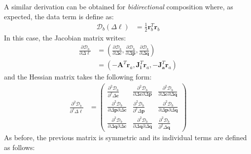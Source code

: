 A similar derivation can be obtained for \emph{bidirectional} composition where, as expected, the data term is define as:
\begin{equation}
    \begin{aligned}
		\mathcal{D}_b(\Delta \boldsymbol{\ell}) & = \frac{1}{2}\mathbf{r}_b^T \mathbf{r}_b
    \label{eq:bidirectional_data}
    \end{aligned}
\end{equation}
In this case, the Jacobian matrix writes:
\begin{equation}
    \begin{aligned}
		\frac{\partial \mathcal{D}_b}{\partial \Delta \boldsymbol{\ell}} & = \left( \frac{\partial \mathcal{D}_b}{\partial \Delta \mathbf{c}}, \frac{\partial \mathcal{D}_b}{\partial \Delta \mathbf{p}}, \frac{\partial \mathcal{D}_b}{\partial \Delta \mathbf{q}} \right)
		\\
		& = \left( -\mathbf{A}^T \mathbf{r}_a, \mathbf{J}_{\mathbf{i}}^T \mathbf{r}_a, -\mathbf{J}_{\mathbf{a}}^T \mathbf{r}_a \right)
    \label{eq:bidirectional_newton_jacobian}
    \end{aligned}
\end{equation}
and the Hessian matrix takes the following form:
\begin{equation}
    \begin{aligned}
		\frac{\partial^2 \mathcal{D}_b}{\partial^2 \Delta \boldsymbol{\ell}} & =
		\begin{pmatrix}
			\frac{\partial^2 \mathcal{D}_b}{\partial^2 \Delta \mathbf{c}} & \frac{\partial^2 \mathcal{D}_b}{\partial \Delta \mathbf{c} \partial \Delta \mathbf{p}} & \frac{\partial^2 \mathcal{D}_b}{\partial \Delta \mathbf{c} \partial \Delta \mathbf{q}}
			\\
			\frac{\partial^2 \mathcal{D}_b}{\partial \Delta \mathbf{p} \partial \Delta \mathbf{c}} & \frac{\partial^2 \mathcal{D}_b}{\partial^2 \Delta \mathbf{p}} & \frac{\partial^2 \mathcal{D}_b}{\partial \Delta \mathbf{p} \partial \Delta \mathbf{q}}
			\\
			\frac{\partial^2 \mathcal{D}_b}{\partial \Delta \mathbf{q} \partial \Delta \mathbf{c}} & \frac{\partial^2 \mathcal{D}_b}{\partial \Delta \mathbf{q} \partial \Delta \mathbf{q}}
			& \frac{\partial^2 \mathcal{D}_b}{\partial^2 \Delta \mathbf{q}}
		\end{pmatrix}
    \label{eq:bidirectional_newton_hessian}
    \end{aligned}
\end{equation}
As before, the previous matrix is symmetric and its individual terms are defined as follows:
